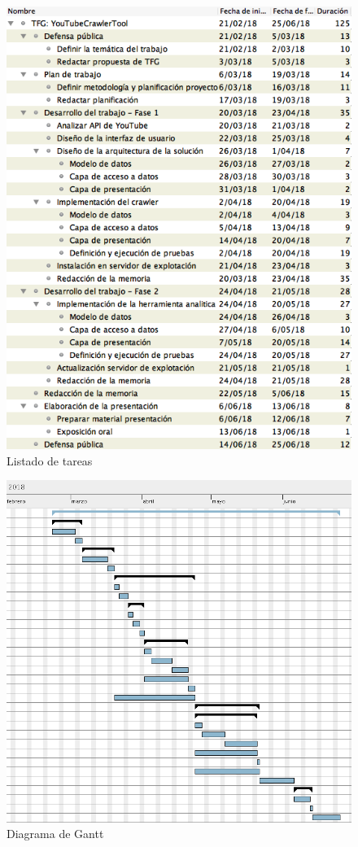 \documentclass[11pt,a4paper]{article}
\begin{document}
\begin{figure}[H]
\centering
\includegraphics[scale=0.4]{planificacion/listado-tareas.png}
\caption{Listado de tareas}
\end{figure}

\begin{figure}[H]
\centering
\includegraphics[scale=0.3]{planificacion/diagrama-gantt.png}
\caption{Diagrama de Gantt}
\end{figure}
\end{document}
